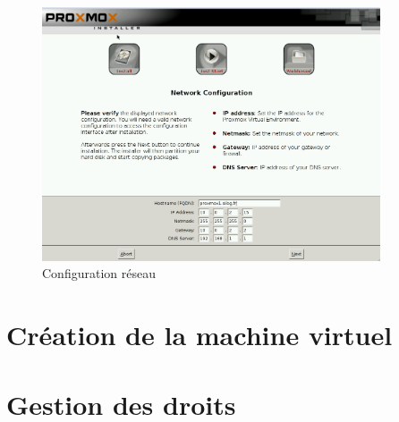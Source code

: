 \documentclass[12pt,a4paper]{article}
\begin{document}
\begin{figure}[!ht]
\center
\includegraphics[width=10cm]{Images/6.PNG}  
\caption{Configuration réseau}
\end{figure}

\section{Création de la machine virtuel}
\section{Gestion des droits}
\end{document}
